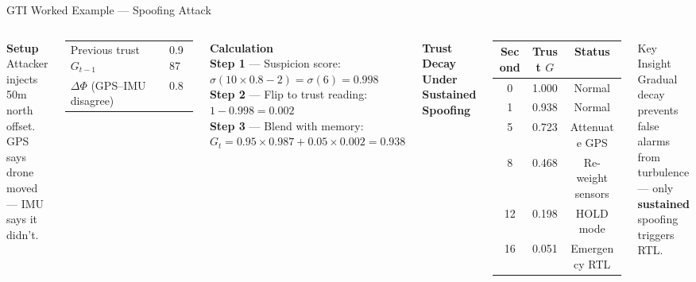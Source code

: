 \documentclass[11pt]{beamer}
\begin{document}
\begin{frame}{GTI Worked Example — Spoofing Attack}
\begin{columns}[c]
\textbf{\footnotesize Setup}\\[1mm]
\scriptsize
Attacker injects 50m north offset.\\
GPS says drone moved — IMU says it didn't.\\[1mm]
\begin{tabular}{@{}ll@{}}
\toprule
Previous trust $G_{t-1}$ & 0.987 \\
$\Delta\Phi$ (GPS--IMU disagree) & 0.8 \\
\bottomrule
\end{tabular}
\vspace{3mm}

\textbf{\footnotesize Calculation}\\[1mm]
\scriptsize
\textbf{Step 1} — Suspicion score:\\
$\sigma(10 \times 0.8 - 2) = \sigma(6) = 0.998$\\[2mm]
\textbf{Step 2} — Flip to trust reading:\\
$1 - 0.998 = 0.002$\\[2mm]
\textbf{Step 3} — Blend with memory:\\
$G_t = 0.95 \times 0.987 + 0.05 \times 0.002 = \mathbf{0.938}$

\textbf{\footnotesize Trust Decay Under Sustained Spoofing}\\[1mm]
\scriptsize
\begin{tabular}{@{}ccc@{}}
\toprule
\textbf{Second} & \textbf{Trust $G$} & \textbf{Status} \\
\midrule
0  & 1.000 & \textcolor{green!50!black}{Normal} \\
1  & 0.938 & \textcolor{green!50!black}{Normal} \\
5  & 0.723 & \textcolor{orange!80!black}{Attenuate GPS} \\
8  & 0.468 & \textcolor{orange!80!black}{Re-weight sensors} \\
12 & 0.198 & \textcolor{red!70!black}{HOLD mode} \\
16 & 0.051 & \textcolor{red!70!black}{Emergency RTL} \\
\bottomrule
\end{tabular}
\vspace{2mm}
\begin{block}{\footnotesize Key Insight}
\scriptsize
Gradual decay prevents false alarms from\\
turbulence — only \textbf{sustained} spoofing\\
triggers RTL.
\end{block}
\end{columns}
\end{frame}
\end{document}
